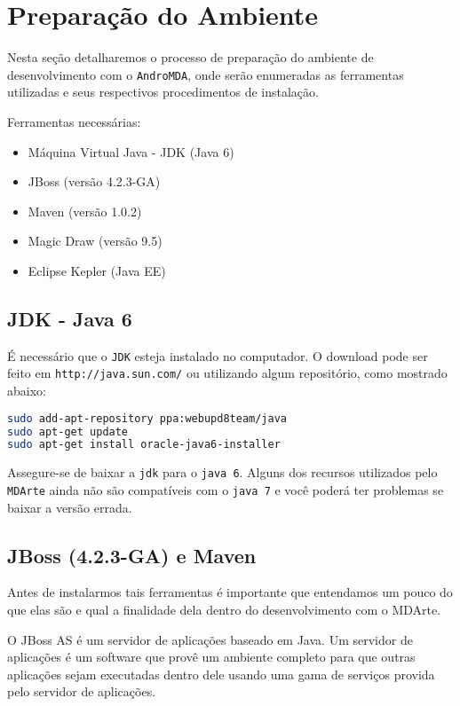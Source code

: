 \chapter{Preparação do Ambiente}

Nesta seção detalharemos o processo de preparação do ambiente de desenvolvimento
com o \texttt{AndroMDA}, onde serão enumeradas as ferramentas utilizadas e seus
respectivos procedimentos de instalação.

Ferramentas necessárias:
\begin{itemize}
  \item Máquina Virtual Java - JDK (Java 6)
  \item JBoss (versão 4.2.3-GA)
  \item Maven (versão 1.0.2) 
  \item Magic Draw (versão 9.5)
  \item Eclipse Kepler (Java EE)
\end{itemize}

\section{JDK - Java 6}

É necessário que o \texttt{JDK} esteja instalado no computador. O
download pode ser feito em \texttt{http://java.sun.com/} ou utilizando
algum repositório, como mostrado abaixo:

\begin{lstlisting}[language=bash]
sudo add-apt-repository ppa:webupd8team/java
sudo apt-get update
sudo apt-get install oracle-java6-installer
\end{lstlisting}

Assegure-se de baixar a \texttt{jdk} para o \texttt{java 6}. Alguns dos recursos
utilizados pelo \texttt{MDArte} ainda não são compatíveis com o \texttt{java 7}
e você poderá ter problemas se baixar a versão errada.

\section{JBoss (4.2.3-GA) e Maven}

Antes de instalarmos tais ferramentas é importante que entendamos um pouco do
que elas são e qual a finalidade dela dentro do desenvolvimento com o MDArte.

O JBoss AS é um servidor de aplicações baseado em Java. Um servidor de
aplicações é um software que provê um ambiente completo para que outras
aplicações sejam executadas dentro dele usando uma gama de serviços provida pelo
servidor de aplicações.

